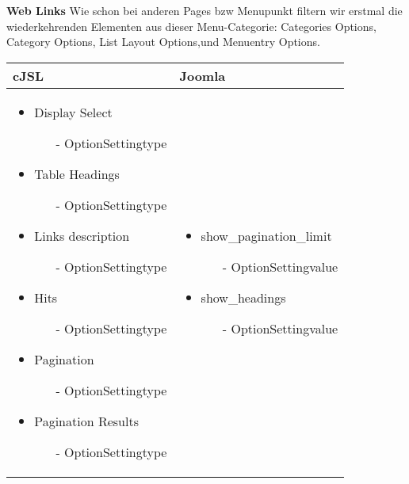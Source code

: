 \textbf{Web Links }
Wie schon bei anderen Pages bzw Menupunkt filtern wir erstmal  die wiederkehrenden Elementen aus dieser Menu-Categorie: Categories Options, Category Options, List Layout Options,und Menuentry Options.

\begin{minipage}{0.7\textwidth}
\begin{tabular}{|p{} | p{}|}
\hline
\textbf{cJSL} & \textbf{Joomla} \\ 
\hline
\begin{itemize}
\item Display Select
 \begin{enumerate}
    \item[-] OptionSettingtype
  \end{enumerate} 
\item Table Headings
 \begin{enumerate}
    \item[-] OptionSettingtype
  \end{enumerate} 
\item Links description
 \begin{enumerate}
    \item[-] OptionSettingtype
  \end{enumerate} 
\item Hits
 \begin{enumerate}
    \item[-] OptionSettingtype
  \end{enumerate}  
\item Pagination
 \begin{enumerate}
    \item[-] OptionSettingtype
  \end{enumerate}  
\item Pagination Results
 \begin{enumerate}
    \item[-] OptionSettingtype
  \end{enumerate}  
\end{itemize} 
 & 
\begin{itemize}
\item show\_pagination\_limit
\begin{enumerate}
    \item[-] OptionSettingvalue
  \end{enumerate} 
\item show\_headings
\begin{enumerate}
    \item[-] OptionSettingvalue

\end{enumerate}
\end{itemize}
\end{tabular}
\end{minipage}

